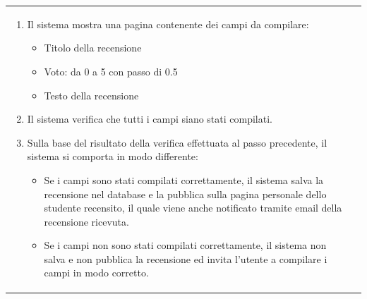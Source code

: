 \documentclass[10pt,a4paper]{article}
\begin{document}
\begin{tabular}{lp{}}
\begin{enumerate}
			\item Il sistema mostra una pagina contenente dei campi da compilare:
			\begin{itemize}
				\item Titolo della recensione
				\item Voto: da 0 a 5 con passo di 0.5
				\item Testo della recensione
			\end{itemize}
			\item Il sistema verifica che tutti i campi siano stati compilati.
			\item Sulla base del risultato della verifica effettuata al passo precedente, il sistema si comporta in modo differente:
			\begin{itemize}
				\item Se i campi sono stati compilati correttamente, il sistema salva la recensione nel database e la pubblica sulla pagina personale dello studente recensito, il quale viene anche notificato tramite email della recensione ricevuta.
				\item Se i campi non sono stati compilati correttamente, il sistema non salva e non pubblica la recensione ed invita l'utente a compilare i campi in modo corretto.
			\end{itemize}
		\end{enumerate}
	\end{tabular}
\end{document}
